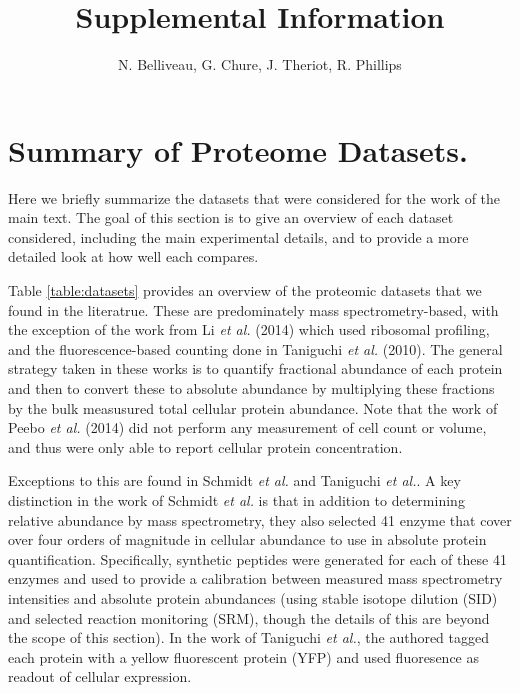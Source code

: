 \documentclass[11pt]{article}
\author{N. Belliveau, G. Chure, J. Theriot, R. Phillips}
\begin{document}
\title{Supplemental Information}
\maketitle

\section{Summary of Proteome Datasets.}

Here we briefly summarize the datasets that were considered for the work of the main
text. The goal of this section is to give an overview of each dataset
considered, including the main experimental details, and to provide a more
detailed look at how well each compares.

Table \ref{table:datasets} provides an overview of the proteomic datasets that
we found in the literatrue. These are predominately mass spectrometry-based,
with the exception of the work from Li {\it et al.} (2014) which used ribosomal
profiling, and the fluorescence-based counting done in Taniguchi {\it et al.}
(2010). The general strategy taken in these works is to quantify fractional
abundance of each protein and then to convert these to absolute abundance by
multiplying these fractions by the bulk measusured total cellular protein
abundance. Note that the work of Peebo {\it et al.} (2014) did not perform any
measurement of cell count or volume, and thus were only able to report cellular
protein concentration.

Exceptions to this are found in Schmidt {\it et al.} and Taniguchi {\it et al.}.
A key distinction in the work of Schmidt {\it et al.} is that in addition to
determining relative abundance by mass spectrometry, they also selected 41
enzyme that cover over four orders of magnitude in cellular abundance to use in
absolute protein quantification. Specifically, synthetic peptides were generated
for each of these 41 enzymes and used to provide a calibration between measured
mass spectrometry intensities and absolute protein abundances (using stable
isotope dilution (SID) and selected reaction monitoring (SRM), though the
details of this are beyond the scope of this section). In the work of Taniguchi
{\it et al.},  the authored tagged each protein with a  yellow fluorescent
protein (YFP) and used fluoresence as readout of cellular expression.
\end{document}
